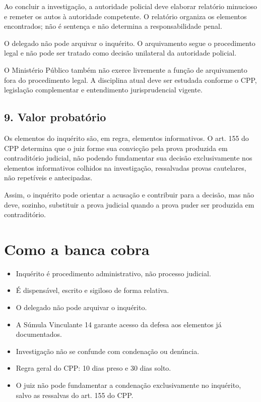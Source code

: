 \documentclass[11pt,a4paper]{article}
\begin{document}
Ao concluir a investigação, a autoridade policial deve elaborar relatório minucioso e remeter os autos à autoridade competente. O relatório organiza os elementos encontrados; não é sentença e não determina a responsabilidade penal.

O delegado não pode arquivar o inquérito. O arquivamento segue o procedimento legal e não pode ser tratado como decisão unilateral da autoridade policial.

O Ministério Público também não exerce livremente a função de arquivamento fora do procedimento legal. A disciplina atual deve ser estudada conforme o CPP, legislação complementar e entendimento jurisprudencial vigente.

\subsection*{9. Valor probatório}

Os elementos do inquérito são, em regra, elementos informativos. O art. 155 do CPP determina que o juiz forme sua convicção pela prova produzida em contraditório judicial, não podendo fundamentar sua decisão exclusivamente nos elementos informativos colhidos na investigação, ressalvadas provas cautelares, não repetíveis e antecipadas.

Assim, o inquérito pode orientar a acusação e contribuir para a decisão, mas não deve, sozinho, substituir a prova judicial quando a prova puder ser produzida em contraditório.

\section*{Como a banca cobra}

\begin{itemize}
  \item Inquérito é procedimento administrativo, não processo judicial.
  \item É dispensável, escrito e sigiloso de forma relativa.
  \item O delegado não pode arquivar o inquérito.
  \item A Súmula Vinculante 14 garante acesso da defesa aos elementos já documentados.
  \item Investigação não se confunde com condenação ou denúncia.
  \item Regra geral do CPP: 10 dias preso e 30 dias solto.
  \item O juiz não pode fundamentar a condenação exclusivamente no inquérito, salvo as ressalvas do art. 155 do CPP.
\end{itemize}
\end{document}

